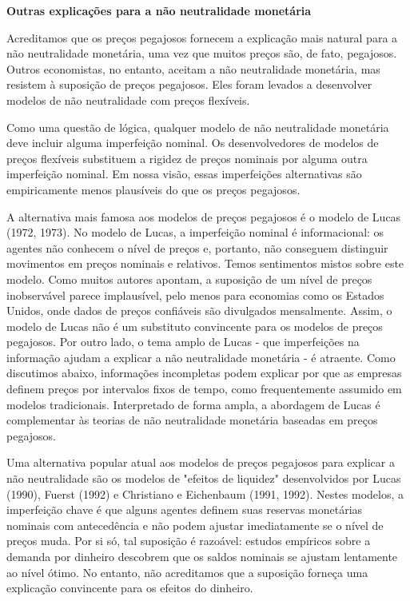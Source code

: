 \documentclass[12pt]{article}
\begin{document}
\textbf{Outras explicações para a não neutralidade monetária}

Acreditamos que os preços pegajosos fornecem a explicação mais natural para a não neutralidade monetária, uma vez que muitos preços são, de fato, pegajosos. Outros economistas, no entanto, aceitam a não neutralidade monetária, mas resistem à suposição de preços pegajosos. Eles foram levados a desenvolver modelos de não neutralidade com preços flexíveis.

Como uma questão de lógica, qualquer modelo de não neutralidade monetária deve incluir alguma imperfeição nominal. Os desenvolvedores de modelos de preços flexíveis substituem a rigidez de preços nominais por alguma outra imperfeição nominal. Em nossa visão, essas imperfeições alternativas são empiricamente menos plausíveis do que os preços pegajosos.

A alternativa mais famosa aos modelos de preços pegajosos é o modelo de Lucas (1972, 1973). No modelo de Lucas, a imperfeição nominal é informacional: os agentes não conhecem o nível de preços e, portanto, não conseguem distinguir movimentos em preços nominais e relativos. Temos sentimentos mistos sobre este modelo. Como muitos autores apontam, a suposição de um nível de preços inobservável parece implausível, pelo menos para economias como os Estados Unidos, onde dados de preços confiáveis são divulgados mensalmente. Assim, o modelo de Lucas não é um substituto convincente para os modelos de preços pegajosos. Por outro lado, o tema amplo de Lucas - que imperfeições na informação ajudam a explicar a não neutralidade monetária - é atraente. Como discutimos abaixo, informações incompletas podem explicar por que as empresas definem preços por intervalos fixos de tempo, como frequentemente assumido em modelos tradicionais. Interpretado de forma ampla, a abordagem de Lucas é complementar às teorias de não neutralidade monetária baseadas em preços pegajosos.

Uma alternativa popular atual aos modelos de preços pegajosos para explicar a não neutralidade são os modelos de "efeitos de liquidez" desenvolvidos por Lucas (1990), Fuerst (1992) e Christiano e Eichenbaum (1991, 1992). Nestes modelos, a imperfeição chave é que alguns agentes definem suas reservas monetárias nominais com antecedência e não podem ajustar imediatamente se o nível de preços muda. Por si só, tal suposição é razoável: estudos empíricos sobre a demanda por dinheiro descobrem que os saldos nominais se ajustam lentamente ao nível ótimo. No entanto, não acreditamos que a suposição forneça uma explicação convincente para os efeitos do dinheiro.
\end{document}
